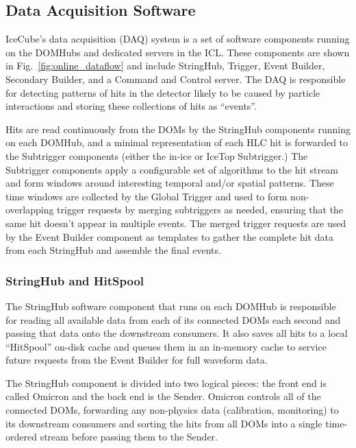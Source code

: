 \subsection{Data Acquisition Software}

IceCube's data acquisition (DAQ) system is a set of software components
running on the DOMHubs and dedicated servers in the ICL.  These components are shown in
Fig.~\ref{fig:online_dataflow} and include StringHub, Trigger, Event
Builder, Secondary Builder, and a Command and Control server.  The DAQ is
responsible for detecting patterns of hits in the detector likely to be
caused by particle interactions and storing these collections of hits as
``events''.

Hits are read continuously from the DOMs by the
StringHub components running on each DOMHub, and a minimal representation of each HLC hit is
forwarded to the Subtrigger components (either the in-ice or IceTop Subtrigger.)
The Subtrigger components apply a
configurable set of algorithms to the hit stream and form windows around interesting temporal
and/or spatial patterns.  These time windows are collected by the
Global Trigger and used to form non-overlapping trigger requests by merging
subtriggers as needed, ensuring that the same hit doesn't appear in
multiple events.  The merged trigger requests are used by the Event Builder
component as templates 
to gather the complete hit data from each StringHub and assemble the final
events.

\subsubsection{StringHub and HitSpool}
\label{sec:domhub_hitspool}

The StringHub software component that runs on each DOMHub is responsible
for reading all available data from each of its connected DOMs each second
and passing that data onto the downstream consumers.  It also saves all
hits to a local ``HitSpool'' on-disk cache and queues them in an
in-memory cache to service future requests from the Event Builder for full
waveform data.

The StringHub component is divided into two logical pieces: the front
end is called Omicron and the back end is the Sender. Omicron controls all
of the connected DOMs, forwarding any 
non-physics data (calibration, monitoring) to its downstream consumers and
sorting the hits from all 
DOMs into a single time-ordered stream before passing them to the Sender.  

